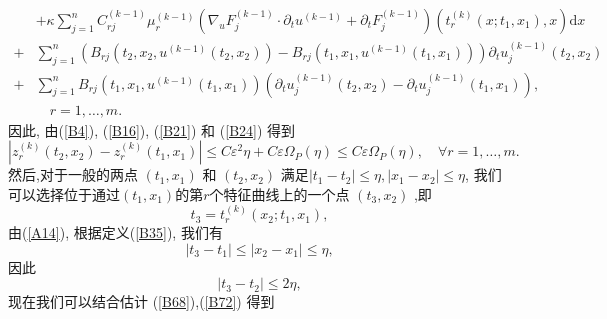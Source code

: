 \documentclass[notitlepage,cs4size,punct,oneside]{ctexrep}
\numberwithin{equation}{chapter}
\theoremstyle{mystyle}
\begin{document}
\begin{align}
      & +\kappa \sum_{j=1}^{n} C_{r j}^{(k-1)}\mu_{r}^{(k-1)} \left(\nabla_{u} F_{j}^{(k-1)} \cdot \partial_{t} u^{(k-1)} + \partial _{t} F_{j} ^{(k-1)}\right)\left(t_{r}^{(k)}\left(x ; t_{1}, x_{1}\right), x\right)\mathrm{d} x\nonumber \\
    + & \sum_{j=1}^{n}\left(B_{r j}\left(t_{2}, x_{2},u^{(k-1)}\left(t_{2}, x_{2}\right)\right)-B_{r j}\left(t_{1}, x_{1},u^{(k-1)}\left(t_{1}, x_{1}\right)\right)\right) \partial_{t} u_{j}^{(k-1)}\left(t_{2}, x_{2}\right)\nonumber      \\
    + & \sum_{j=1}^{n} B_{r j}\left(t_{1}, x_{1},u^{(k-1)}\left(t_{1}, x_{1}\right)\right)\left(\partial_{t} u_{j}^{(k-1)}\left(t_{2}, x_{2}\right)-\partial_{t} u_{j}^{(k-1)}\left(t_{1}, x_{1}\right)\right),\nonumber                     \\& \quad r=1, \ldots, m .\label{B71}
\end{align}
因此, 由(\ref{B4}), (\ref{B16}), (\ref{B21}) 和 (\ref{B24}) 得到
\begin{equation} \label{B72}
    \left|z_{r}^{(k)}\left(t_{2}, x_{2}\right)-z_{r}^{(k)}\left(t_{1}, x_{1}\right)\right| \leq C \varepsilon^{2} \eta+C \varepsilon \Omega_{P}(\eta) \leq C \varepsilon \Omega_{P}(\eta), \quad \forall r=1, \ldots, m .
\end{equation}
然后,对于一般的两点 $\left(t_{1}, x_{1}\right)$ 和 $\left(t_{2}, x_{2}\right)$ 满足$\left|t_{1}-t_{2}\right| \leq \eta,\left|x_{1}-x_{2}\right| \leq \eta$, 我们可以选择位于通过$\left(t_{1}, x_{1}\right)$的第$r$个特征曲线上的一个点 $\left(t_{3}, x_{2}\right)$ ,即
\begin{equation} \label{B73}
    t_{3}=t_{r}^{(k)}\left(x_{2} ; t_{1}, x_{1}\right),
\end{equation}
由(\ref{A14}), 根据定义(\ref{B35}), 我们有
\begin{equation} \label{B74}
    \left|t_{3}-t_{1}\right| \leq\left|x_{2}-x_{1}\right| \leq \eta,
\end{equation}
因此
\begin{equation} \label{B75}
    \left|t_{3}-t_{2}\right| \leq 2 \eta,
\end{equation}
现在我们可以结合估计 (\ref{B68}),(\ref{B72}) 得到
\end{document}
